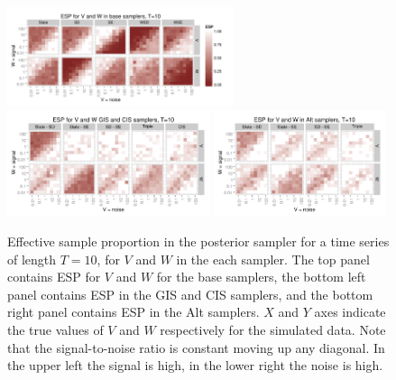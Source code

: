\documentclass{article}
\begin{document}
\begin{figure}[!h]
\centering
\includegraphics[width=0.59\textwidth]{basecisESplot10}
\includegraphics[width=0.53\textwidth]{altintESplotV10}
\includegraphics[width=0.45\textwidth]{altintESplotW10}
\caption{Effective sample proportion in the posterior sampler for a time series of length $T=10$, for $V$ and $W$ in the each sampler. The top panel contains ESP for $V$ and $W$ for the base samplers, the bottom left panel contains ESP in the GIS and CIS samplers, and the bottom right panel contains ESP in the Alt samplers. $X$ and $Y$ axes indicate the true values of $V$ and $W$ respectively for the simulated data. Note that the signal-to-noise ratio is constant moving up any diagonal. In the upper left the signal is high, in the lower right the noise is high.}
\label{ESplot1}
\end{figure}
\end{document}
